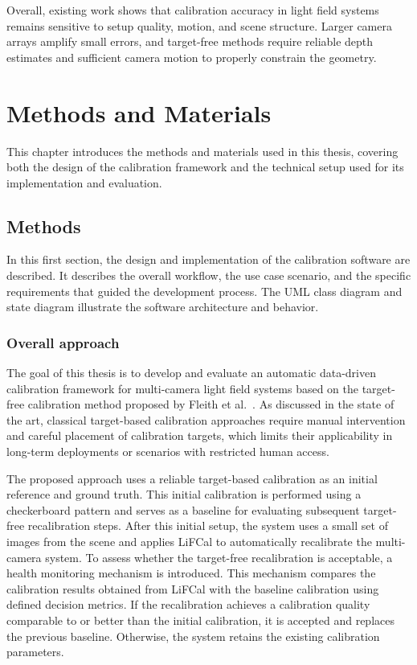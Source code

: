 \documentclass[12pt]{scrartcl}
\begin{document}
Overall, existing work shows that calibration accuracy in light field systems remains sensitive to setup quality, motion, and scene structure. Larger camera arrays amplify small errors, and target-free methods require reliable depth estimates and sufficient camera motion to properly constrain the geometry.


\clearpage

\section{Methods and Materials} \label{Chapter 3}

This chapter introduces the methods and materials used in this thesis, covering both the design of the calibration framework and the technical setup used for its implementation and evaluation.

\subsection{Methods}

In this first section, the design and implementation of the calibration software are described. It describes the overall workflow, the use case scenario, and the specific requirements that guided the development process. The UML class diagram and state diagram illustrate the software architecture and behavior.

\subsubsection{Overall approach}

The goal of this thesis is to develop and evaluate an automatic data-driven calibration framework for multi-camera light field systems based on the target-free calibration method proposed by Fleith et al.~\cite{LiFCal}. As discussed in the state of the art, classical target-based calibration approaches require manual intervention and careful placement of calibration targets, which limits their applicability in long-term deployments or scenarios with restricted human access.
\newline

The proposed approach uses a reliable target-based calibration as an initial reference and ground truth. This initial calibration is performed using a checkerboard pattern and serves as a baseline for evaluating subsequent target-free recalibration steps. After this initial setup, the system uses a small set of images from the scene and applies LiFCal to automatically recalibrate the multi-camera system. To assess whether the target-free recalibration is acceptable, a health monitoring mechanism is introduced. This mechanism compares the calibration results obtained from LiFCal with the baseline calibration using defined decision metrics. If the recalibration achieves a calibration quality comparable to or better than the initial calibration, it is accepted and replaces the previous baseline. Otherwise, the system retains the existing calibration parameters.
\newline
\end{document}
